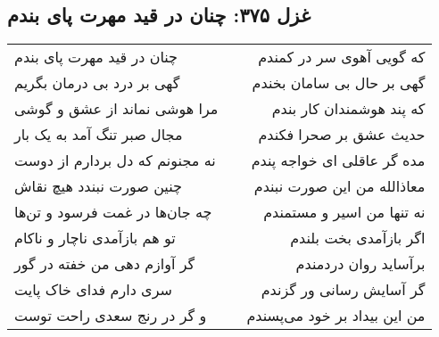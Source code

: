 \begin{center}
\section*{غزل ۳۷۵: چنان در قید مهرت پای بندم}
\label{sec:375}
\begin{longtable}{l p{0.5cm} r}
چنان در قید مهرت پای بندم
&&
که گویی آهوی سر در کمندم
\\
گهی بر درد بی درمان بگریم
&&
گهی بر حال بی سامان بخندم
\\
مرا هوشی نماند از عشق و گوشی
&&
که پند هوشمندان کار بندم
\\
مجال صبر تنگ آمد به یک بار
&&
حدیث عشق بر صحرا فکندم
\\
نه مجنونم که دل بردارم از دوست
&&
مده گر عاقلی ای خواجه پندم
\\
چنین صورت نبندد هیچ نقاش
&&
معاذالله من این صورت نبندم
\\
چه جان‌ها در غمت فرسود و تن‌ها
&&
نه تنها من اسیر و مستمندم
\\
تو هم بازآمدی ناچار و ناکام
&&
اگر بازآمدی بخت بلندم
\\
گر آوازم دهی من خفته در گور
&&
برآساید روان دردمندم
\\
سری دارم فدای خاک پایت
&&
گر آسایش رسانی ور گزندم
\\
و گر در رنج سعدی راحت توست
&&
من این بیداد بر خود می‌پسندم
\\
\end{longtable}
\end{center}
